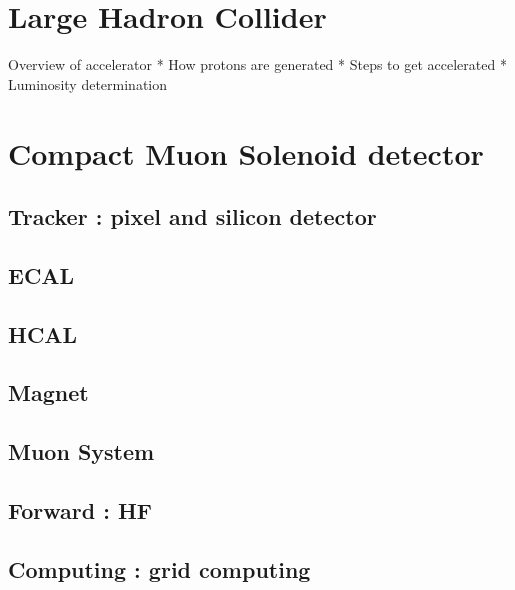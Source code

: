 \section{Large Hadron Collider} 

Overview of accelerator
* How protons are generated 
* Steps to get accelerated 
* Luminosity determination 

\section{Compact Muon Solenoid detector} 
\subsection{Tracker : pixel and silicon detector}
\subsection{ECAL} 
\subsection{HCAL} 
\subsection{Magnet} 
\subsection{Muon System} 
\subsection{Forward : HF}                
\subsection{Computing : grid computing} 

